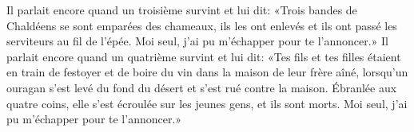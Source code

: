 Il parlait encore quand un troisième survint et lui dit:
	«Trois bandes de Chaldéens se sont emparées des chameaux,
	ils les ont enlevés et ils ont passé les serviteurs au fil de l’épée.
	Moi seul, j’ai pu m’échapper pour te l’annoncer.»
Il parlait encore quand un quatrième survint et lui dit:
	«Tes fils et tes filles étaient en train de festoyer
	et de boire du vin dans la maison de leur frère aîné,
	lorsqu’un ouragan s’est levé du fond du désert et s’est rué contre la maison.
Ébranlée aux quatre coins, elle s’est écroulée sur les jeunes gens, et ils sont morts.
	Moi seul, j’ai pu m’échapper pour te l’annoncer.»
